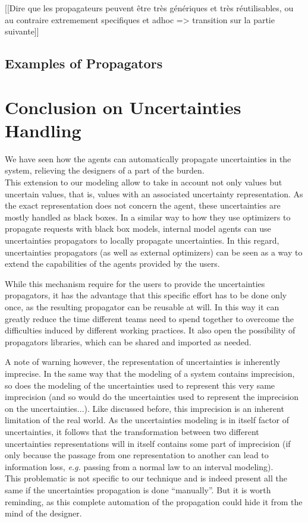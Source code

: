 [[Dire que les propagateurs peuvent être très génériques et très réutilisables, ou au contraire extremement specifiques et adhoc => transition sur la partie suivante]]



\subsection{Examples of Propagators}

\section{Conclusion on Uncertainties Handling}

We have seen how the agents can automatically propagate uncertainties in the system, relieving the designers of a part of the burden.\\
This extension to our modeling allow to take in account not only values but uncertain values, that is, values with an associated uncertainty representation. As the exact representation does not concern the agent, these uncertainties are mostly handled as black boxes. In a similar way to how they use optimizers to propagate requests with black box models, internal model agents can use uncertainties propagators to locally propagate uncertainties. In this regard, uncertainties propagators (as well as external optimizers) can be seen as a way to extend the capabilities of the agents provided by the users.

While this mechanism require for the users to provide the uncertainties propagators, it has the advantage that this specific effort has to be done only once, as the resulting propagator can be reusable at will. In this way it can greatly reduce the time different teams need to spend together to overcome the difficulties induced by different working practices. It also open the possibility of propagators libraries, which can be shared and imported as needed.

A note of warning however, the representation of uncertainties is inherently imprecise. In the same way that the modeling of a system contains imprecision, so does the modeling of the uncertainties used to represent this very same imprecision (and so would do the uncertainties used to represent the imprecision on the uncertainties...). Like discussed before, this imprecision is an inherent limitation of the real world. As the uncertainties modeling is in itself factor of uncertainties, it follows that the transformation between two different uncertainties representations will in itself contains some part of imprecision (if only because the passage from one representation to another can lead to information loss, \emph{e.g.} passing from a normal law to an interval modeling).\\
This problematic is not specific to our technique and is indeed  present all the same if the uncertainties propagation is done \enquote{manually}. But it is worth reminding, as this complete automation of the propagation could hide it from the mind of the designer.

